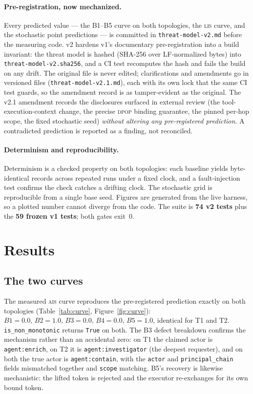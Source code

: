 \documentclass[11pt]{article}
\newcommand{\ais}{\textsc{ais}}
\newcommand{\lis}{\textsc{lis}}
\newcommand{\code}[1]{\texttt{#1}}
\newcommand{\dpop}{\textsc{dpop}}
\begin{document}
\paragraph{Pre-registration, now mechanized.} Every predicted value --- the
B1--B5 curve on both topologies, the \lis{} curve, and the stochastic
point predictions --- is committed in \code{threat-model-v2.md} before the
measuring code. v2 hardens v1's documentary pre-registration into a build
invariant: the threat model is hashed (SHA-256 over LF-normalized bytes) into
\code{threat-model-v2.sha256}, and a CI test recomputes the hash and fails the
build on any drift. The original file is never edited; clarifications and
amendments go in versioned files (\code{threat-model-v2.1.md}), each with its
own lock that the same CI test guards, so the amendment record is as
tamper-evident as the original. The v2.1 amendment records the disclosures
surfaced in external review (the tool-execution-context change, the precise
\dpop{} binding guarantee, the pinned per-hop scope, the fixed stochastic seed)
\emph{without altering any pre-registered prediction}. A contradicted
prediction is reported as a finding, not reconciled.

\paragraph{Determinism and reproducibility.}
Determinism is a checked property on both topologies: each baseline yields
byte-identical records across repeated runs under a fixed clock, and a
fault-injection test confirms the check catches a drifting clock. The
stochastic grid is reproducible from a single base seed. Figures are
generated from the live harness, so a plotted number cannot diverge from the
code. The suite is \textbf{74 v2 tests} plus the \textbf{59 frozen v1 tests};
both gates exit~0.

\section{Results}
\label{sec:results}

\subsection{The two curves}
The measured \ais{} curve reproduces the pre-registered prediction exactly on
both topologies (Table~\ref{tab:curve}, Figure~\ref{fig:curve}):
$B1{=}0.0,\,B2{=}1.0,\,B3{=}0.0,\,B4{=}0.0,\,B5{=}1.0$, identical for T1 and
T2. \code{is\_non\_monotonic} returns \code{True} on both. The B3 defect
breakdown confirms the mechanism rather than an accidental zero: on T1 the
claimed actor is \code{agent:enrich}, on T2 it is \code{agent:investigator}
(the deepest requester), and on both the true actor is \code{agent:contain},
with the \code{actor} and \code{principal\_chain} fields mismatched together
and \code{scope} matching. B5's recovery is likewise mechanistic: the lifted
token is rejected and the executor re-exchanges for its own bound token.
\end{document}
